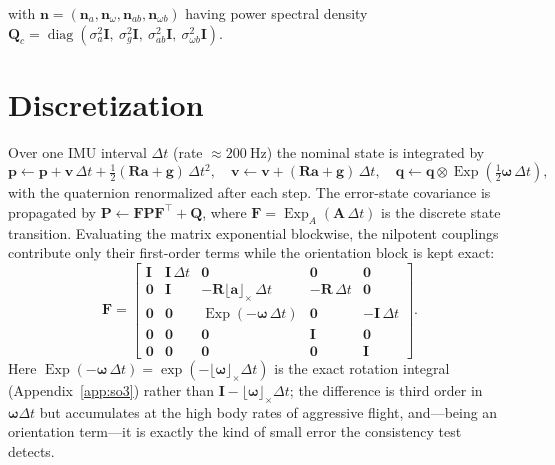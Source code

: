 \documentclass[11pt]{article}
\newcommand{\R}{\mathbf{R}}
\newcommand{\I}{\mathbf{I}}
\newcommand{\bp}{\mathbf{p}}
\newcommand{\bv}{\mathbf{v}}
\newcommand{\ba}{\mathbf{a}}
\newcommand{\bg}{\mathbf{g}}
\newcommand{\bn}{\mathbf{n}}
\newcommand{\bomega}{\bm{\omega}}
\newcommand{\bq}{\mathbf{q}}
\newcommand{\bF}{\mathbf{F}}
\newcommand{\bP}{\mathbf{P}}
\newcommand{\bQ}{\mathbf{Q}}
\newcommand{\bA}{\mathbf{A}}
\newcommand{\skewm}[1]{\lfloor #1 \rfloor_\times}
\DeclareMathOperator{\diag}{diag}
\DeclareMathOperator{\Exp}{Exp}
\begin{document}
with $\bn=(\bn_a,\bn_\omega,\bn_{ab},\bn_{\omega b})$ having power spectral density
$\bQ_c=\diag(\sigma_a^2\I,\ \sigma_g^2\I,\ \sigma_{ab}^2\I,\ \sigma_{\omega b}^2\I)$.

\section{Discretization}
\label{sec:disc}

Over one IMU interval $\Delta t$ (rate $\approx\SI{200}{\hertz}$) the nominal state is integrated by
\begin{equation}
  \bp \leftarrow \bp + \bv\,\Delta t + \tfrac{1}{2}(\R\ba + \bg)\,\Delta t^2, \quad
  \bv \leftarrow \bv + (\R\ba + \bg)\,\Delta t, \quad
  \bq \leftarrow \bq \otimes \Exp\!\left(\tfrac{1}{2}\bomega\,\Delta t\right),
  \label{eq:nominal}
\end{equation}
with the quaternion renormalized after each step. The error-state covariance is propagated by
$\bP \leftarrow \bF\bP\bF^{\!\top} + \bQ$, where $\bF=\Exp_{\!A}(\bA\,\Delta t)$ is the discrete state
transition. Evaluating the matrix exponential blockwise, the nilpotent couplings contribute only their
first-order terms while the orientation block is kept exact:
\begin{equation}
  \bF =
  \begin{bmatrix}
    \I & \I\,\Delta t & \mathbf{0} & \mathbf{0} & \mathbf{0} \\
    \mathbf{0} & \I & -\R\skewm{\ba}\,\Delta t & -\R\,\Delta t & \mathbf{0} \\
    \mathbf{0} & \mathbf{0} & \Exp(-\bomega\,\Delta t) & \mathbf{0} & -\I\,\Delta t \\
    \mathbf{0} & \mathbf{0} & \mathbf{0} & \I & \mathbf{0} \\
    \mathbf{0} & \mathbf{0} & \mathbf{0} & \mathbf{0} & \I
  \end{bmatrix}.
  \label{eq:F}
\end{equation}
Here $\Exp(-\bomega\,\Delta t)=\exp(-\skewm{\bomega}\Delta t)$ is the exact rotation integral
(Appendix~\ref{app:so3}) rather than $\I-\skewm{\bomega}\Delta t$; the difference is third order in
$\bomega\Delta t$ but accumulates at the high body rates of aggressive flight, and---being an
orientation term---it is exactly the kind of small error the consistency test detects.
\end{document}
